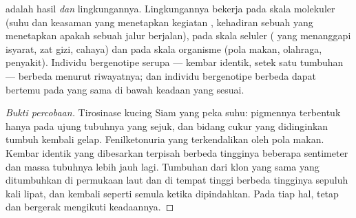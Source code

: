 \begin{proposition}\label{prop:g11:enzymes-and-phenotype:environment}
 adalah hasil  \emph{dan} lingkungannya.
Lingkungannya bekerja pada skala molekuler (suhu dan keasaman yang
menetapkan kegiatan , kehadiran sebuah  yang menetapkan
apakah sebuah jalur berjalan), pada skala seluler ( yang menanggapi
isyarat, zat gizi, cahaya) dan pada skala organisme (pola makan,
olahraga, penyakit). Individu bergenotipe serupa --- kembar identik,
setek satu tumbuhan --- berbeda  menurut riwayatnya; dan
individu bergenotipe berbeda dapat bertemu pada  yang sama di
bawah keadaan yang sesuai.
\end{proposition}
\begin{proof}[Bukti percobaan]
Tirosinase kucing Siam yang peka suhu: pigmennya terbentuk hanya pada
ujung tubuhnya yang sejuk, dan bidang cukur yang didinginkan tumbuh
kembali gelap. Fenilketonuria yang terkendalikan oleh pola makan.
Kembar identik yang dibesarkan terpisah berbeda tingginya beberapa
sentimeter dan massa tubuhnya lebih jauh lagi. Tumbuhan dari klon yang
sama yang ditumbuhkan di permukaan laut dan di tempat tinggi berbeda
tingginya sepuluh kali lipat, dan kembali seperti semula ketika
dipindahkan. Pada tiap hal,  tetap dan  bergerak
mengikuti keadaannya.
\end{proof}

